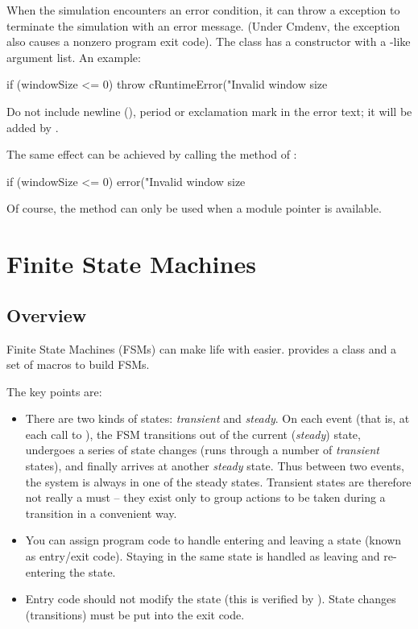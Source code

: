 When the simulation encounters an error condition, it can throw a
 exception to terminate the simulation with an error
message. (Under Cmdenv, the exception also causes a nonzero program exit
code). The  class has a constructor with a
-like argument list. An example:

\begin{cpp}
if (windowSize <= 0)
    throw cRuntimeError("Invalid window size %
\end{cpp}

Do not include newline (), period or exclamation mark
in the error text; it will be added by {\opp}.

The same effect can be achieved by calling the  method of
:

\begin{cpp}
if (windowSize <= 0)
    error("Invalid window size %
\end{cpp}

Of course, the  method can only be used when a module pointer
is available.



\section{Finite State Machines}
\label{sec:simple-modules:fsm}

\subsection{Overview}
\label{sec:simple-modules:fsm-overview}

Finite State Machines (FSMs)
can make life with  easier. {\opp} provides a
class and a set of macros to build FSMs.

The key points are:
\begin{itemize}
\item There are two kinds of states:
    \textit{transient} and
    \textit{steady}. On each event (that is, at
    each call to ), the FSM transitions out of
    the current (\textit{steady}) state, undergoes a series of state
    changes (runs through a number of \textit{transient} states), and
    finally arrives at another \textit{steady} state. Thus between two
    events, the system is always in one of the steady states.
    Transient states are therefore not really a must -- they exist
    only to group actions to be taken during a transition in a
    convenient way.
\item You can assign program code to handle entering and leaving a state
    (known as entry/exit code).
    Staying in the same state is handled as leaving and re-entering
    the state.
\item Entry code should not modify the state (this is verified by
    {\opp}).  State changes (transitions) must be put into the exit
    code.
\end{itemize}

